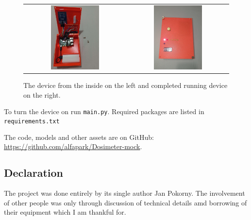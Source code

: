 \documentclass{article}
\begin{document}
\begin{figure}[ht]
    \label{wiring}
    \centering
    \begin{tabular}{cc}
        \includegraphics[width=0.5\textwidth]{imgs/Inside.jpg}
        &
        \includegraphics[width=0.5\textwidth]{imgs/Box1.jpg}
    \end{tabular}
    \caption{The device from the inside on the left and completed running device on the right.}
\end{figure}

    To turn the device on run \texttt{main.py}.
    Required packages are listed in \texttt{requirements.txt}


    The code, models and other assets are on GitHub: \url{https://github.com/alfapark/Dosimeter-mock}.


\subsection{Declaration}
    The project was done entirely by its single author Jan Pokorny. 
    The involvement of other people was only through discussion of technical details amd borrowing of their equipment which I am thankful for.
\end{document}
